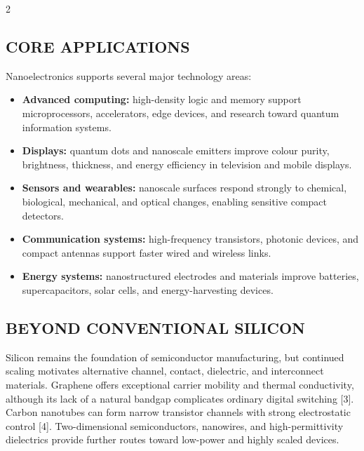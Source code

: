 \begin{multicols}{2}
  \subsection*{\centering\uppercase{Core Applications}}
  Nanoelectronics supports several major technology areas:
  \begin{itemize}\justifying
    \item \textbf{Advanced computing:} high-density logic and memory support microprocessors, accelerators, edge devices, and research toward quantum information systems.
    \item \textbf{Displays:} quantum dots and nanoscale emitters improve colour purity, brightness, thickness, and energy efficiency in television and mobile displays.
    \item \textbf{Sensors and wearables:} nanoscale surfaces respond strongly to chemical, biological, mechanical, and optical changes, enabling sensitive compact detectors.
    \item \textbf{Communication systems:} high-frequency transistors, photonic devices, and compact antennas support faster wired and wireless links.
    \item \textbf{Energy systems:} nanostructured electrodes and materials improve batteries, supercapacitors, solar cells, and energy-harvesting devices.
  \end{itemize}

  \subsection*{\centering\uppercase{Beyond Conventional Silicon}}
  Silicon remains the foundation of semiconductor manufacturing, but continued scaling motivates alternative channel, contact, dielectric, and interconnect materials. Graphene offers exceptional carrier mobility and thermal conductivity, although its lack of a natural bandgap complicates ordinary digital switching [3]. Carbon nanotubes can form narrow transistor channels with strong electrostatic control [4]. Two-dimensional semiconductors, nanowires, and high-permittivity dielectrics provide further routes toward low-power and highly scaled devices.

\end{multicols}

